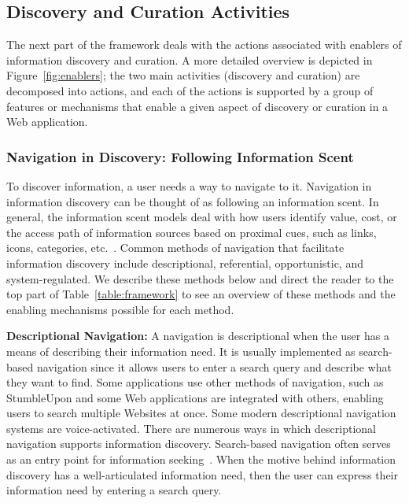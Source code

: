 \documentclass{sigchi}
\newcommand{\feature}[1]{{\ttfamily#1}}
\begin{document}
{\subsection{Discovery and Curation Activities}

The next part of the framework deals with the actions associated with enablers of information discovery and curation. A more detailed overview is depicted in Figure~\ref{fig:enablers}; the two main activities (discovery and curation) are decomposed into actions, and each of the actions is supported by a group of features or mechanisms that enable a given aspect of discovery or curation in a Web application.

{\subsubsection{Navigation in Discovery: Following Information Scent}
To discover information, a user needs a way to navigate to it. Navigation in information discovery can be thought of as following an information scent. In general, the information scent models deal with how users identify value, cost, or the access path of information sources based on proximal cues, such as links, icons, categories, etc.~\cite{pirolli1999information}. Common methods of navigation that facilitate information discovery include descriptional, referential, opportunistic, and system-regulated.  We describe these methods below and direct the reader to the top part of  Table~\ref{table:framework} to see an overview of these methods and the enabling mechanisms possible for each method. 

\textbf{Descriptional Navigation:} A navigation is descriptional when the user has a means of describing their information need. It is usually implemented as \feature{search-based navigation} since it allows users to enter a search query and describe what they want to find.  
Some applications use other methods of navigation, such as StumbleUpon and some Web applications are \feature{integrated} with others, enabling users to search multiple Websites at once. 
Some modern descriptional navigation systems are voice-activated.  
%
There are numerous ways in which descriptional navigation supports information discovery. Search-based navigation often serves as an entry point for information seeking~\cite{levene2011introduction}. When the motive behind information discovery has a well-articulated information need, then the user can express their information need by entering a search query. 

}}
\end{document}
